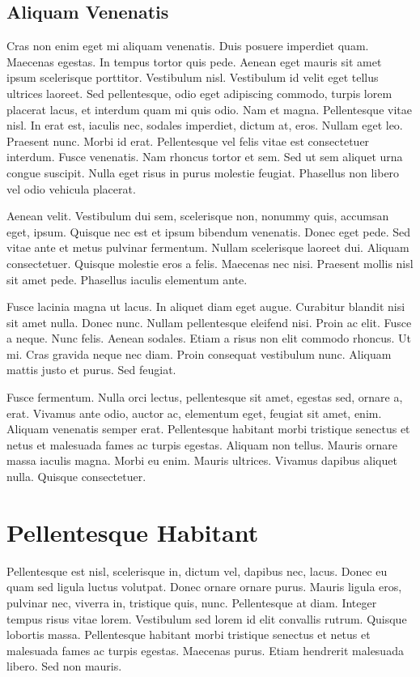 \subsection{Aliquam Venenatis}

Cras non enim eget mi aliquam venenatis. Duis posuere imperdiet quam. Maecenas egestas. In tempus
tortor quis pede. Aenean eget mauris sit amet ipsum scelerisque porttitor. Vestibulum nisl.
Vestibulum id velit eget tellus ultrices laoreet. Sed pellentesque, odio eget adipiscing commodo,
turpis lorem placerat lacus, et interdum quam mi quis odio. Nam et magna. Pellentesque vitae nisl.
In erat est, iaculis nec, sodales imperdiet, dictum at, eros. Nullam eget leo. Praesent nunc. Morbi
id erat. Pellentesque vel felis vitae est consectetuer interdum. Fusce venenatis. Nam rhoncus tortor
et sem. Sed ut sem aliquet urna congue suscipit. Nulla eget risus in purus molestie feugiat.
Phasellus non libero vel odio vehicula placerat.

Aenean velit. Vestibulum dui sem, scelerisque non, nonummy quis, accumsan eget, ipsum. Quisque nec
est et ipsum bibendum venenatis. Donec eget pede. Sed vitae ante et metus pulvinar fermentum. Nullam
scelerisque laoreet dui. Aliquam consectetuer. Quisque molestie eros a felis. Maecenas nec nisi.
Praesent mollis nisl sit amet pede. Phasellus iaculis elementum ante.

Fusce lacinia magna ut lacus. In aliquet diam eget augue. Curabitur blandit nisi sit amet nulla.
Donec nunc. Nullam pellentesque eleifend nisi. Proin ac elit. Fusce a neque. Nunc felis. Aenean
sodales. Etiam a risus non elit commodo rhoncus. Ut mi. Cras gravida neque nec diam. Proin consequat
vestibulum nunc. Aliquam mattis justo et purus. Sed feugiat.

Fusce fermentum. Nulla orci lectus, pellentesque sit amet, egestas sed, ornare a, erat. Vivamus ante
odio, auctor ac, elementum eget, feugiat sit amet, enim. Aliquam venenatis semper erat. Pellentesque
habitant morbi tristique senectus et netus et malesuada fames ac turpis egestas. Aliquam non tellus.
Mauris ornare massa iaculis magna. Morbi eu enim. Mauris ultrices. Vivamus dapibus aliquet nulla.
Quisque consectetuer.

\section{Pellentesque Habitant}

Pellentesque est nisl, scelerisque in, dictum vel, dapibus nec, lacus. Donec eu quam sed ligula
luctus volutpat. Donec ornare ornare purus. Mauris ligula eros, pulvinar nec, viverra in, tristique
quis, nunc. Pellentesque at diam. Integer tempus risus vitae lorem. Vestibulum sed lorem id elit
convallis rutrum. Quisque lobortis massa. Pellentesque habitant morbi tristique senectus et netus et
malesuada fames ac turpis egestas. Maecenas purus. Etiam hendrerit malesuada libero. Sed non mauris.

